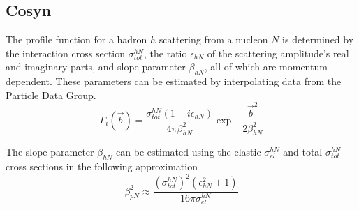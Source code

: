 \subsection{Cosyn}

The profile function for a hadron $h$ scattering from a nucleon $N$ is
determined by
the interaction cross section $\sigma^{hN}_{tot}$,
the ratio $\epsilon_{hN}$ of the scattering amplitude's real and imaginary parts,
and slope parameter $\beta_{hN}$,
all of which are momentum-dependent.
These parameters can be estimated by interpolating data from the Particle Data
Group.
\begin{equation}
    \Gamma_i(\vec{b}) =
        \frac{\sigma^{hN}_{tot}(1-i\epsilon_{hN})}
             {4\pi\beta_{hN}^2}
        \exp{-\frac{\vec{b}^2}{2\beta_{hN}^2}}
\end{equation}

The slope parameter $\beta_{hN}$ can be estimated using
the elastic $\sigma^{hN}_{el}$ and total $\sigma^{hN}_{tot}$ cross sections
in the following
approximation~\cite{Ryckebusch_2003}
\begin{equation}
    \beta_{p N}^{2} \approx
            \frac{(\sigma^{hN}_{tot})^{2} (\epsilon_{hN}^{2}+1)}
                 {16 \pi \sigma^{hN}_{el}}
\end{equation}

